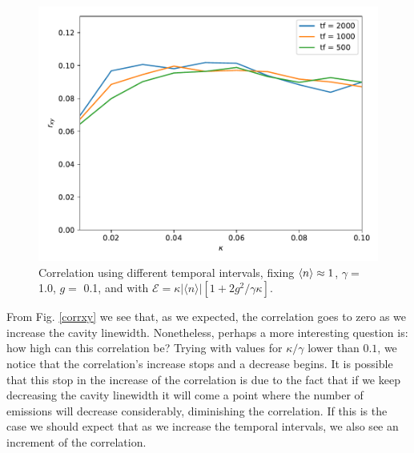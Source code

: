 \documentclass[conference]{IEEEtran}
\begin{document}
\begin{center}
\begin{figure}[h!]
\begin{center}
\includegraphics[scale = 0.45]{difftimes12.pdf}
\caption{\small{Correlation using different temporal intervals, fixing $\expval{n} \approx 1$, $\gamma =$ 1.0, $g =$ 0.1, and with  $\mathcal{E} =  \kappa |\langle n \rangle|[1 + 2g^2/\gamma \kappa]$.}}  \label{errorzz}
\end{center}
\end{figure}
\end{center}
From Fig. \ref{corrxy} we see that, as we expected, the correlation goes to zero as we increase the cavity linewidth. Nonetheless, perhaps a more interesting question is: how high can this correlation be? Trying with values for $\kappa/\gamma$ lower than $0.1$, we notice that the correlation's increase stops and a decrease begins. It is possible that this stop in the increase of the correlation is due to the fact that if we keep decreasing the cavity linewidth it will come a point where the number of emissions will decrease considerably, diminishing the correlation. If this is the case we should expect that as we increase the temporal intervals, %
we also see an increment of the correlation.

\end{document}
